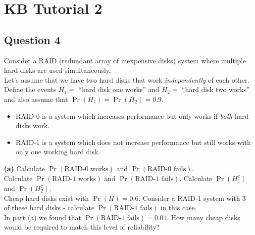 \documentclass[]{article}
\begin{document}
	
	

%
%
%	
%
%	


\section{KB Tutorial 2}

\subsection*{Question 4}
Consider a RAID (redundant array of inexpensive disks) system where multiple hard disks are used simultaneously.\\[0.2cm]
Let's assume that we have two hard disks that work \emph{independently} of each other. Define the events $H_1 =$ ``hard disk one works'' and $H_2 =$ ``hard disk two works'' and also assume that $\Pr(H_1) = \Pr(H_2) = 0.9$.\\ \smallskip
\begin{itemize}
	\item RAID-0 is a system which increases performance but only works if \emph{both} hard disks work.
	\item RAID-1 is a system which does not increase performance but still works with only one working hard disk.
\end{itemize}

{\bf(a)} Calculate $\Pr(\text{RAID-0 works})$ and $\Pr(\text{RAID-0 fails})$. \\[0.3cm]  Calculate $\Pr(\text{RAID-1 works})$ and $\Pr(\text{RAID-1 fails})$.  Calculate $\Pr(H_1^c)$ and $\Pr(H_2^c)$. \\[0.3cm]
 Cheap hard disks exist with $\Pr(H) = 0.6$. Consider a RAID-1 system with 3 of these hard disks - calculate $\Pr(\text{RAID-1 fails})$ in this case. \\[0.3cm]  In part (a) we found that $\Pr(\text{RAID-1 fails}) = 0.01$. How many cheap disks would be required to match this level of reliability?
\end{document}
